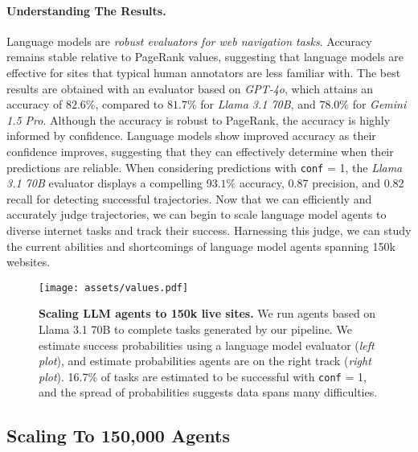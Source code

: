 \paragraph{Understanding The Results.} Language models are \textit{robust evaluators for web navigation tasks}. Accuracy remains stable relative to PageRank values, suggesting that language models are effective for sites that typical human annotators are less familiar with. The best results are obtained with an evaluator based on \textit{GPT-4o}, which attains an accuracy of $82.6\%$, compared to $81.7\%$ for \textit{Llama 3.1 70B}, and $78.0\%$ for \textit{Gemini 1.5 Pro}. Although the accuracy is robust to PageRank, the accuracy is highly informed by confidence. Language models show improved accuracy as their confidence improves, suggesting that they can effectively determine when their predictions are reliable. When considering predictions with \texttt{conf} = 1, the \textit{Llama 3.1 70B} evaluator displays a compelling $93.1\%$ accuracy, 0.87 precision, and 0.82 recall for detecting successful trajectories. Now that we can efficiently and accurately judge trajectories, we can begin to scale language model agents to diverse internet tasks and track their success. Harnessing this judge, we can study the current abilities and shortcomings of language model agents spanning 150k websites.

\begin{wrapfigure}{r}{0.48\textwidth}
    \centering
    \vspace{-1.5cm}
    \texttt{[image: assets/values.pdf]}
    \vspace{-0.7cm}
    \caption{\small \textbf{Scaling LLM agents to 150k live sites.} We run agents based on Llama 3.1 70B to complete tasks generated by our pipeline. We estimate success probabilities using a language model evaluator (\textit{left plot}), and estimate probabilities agents are on the right track (\textit{right plot}). 16.7\% of tasks are estimated to be successful with \texttt{conf} = 1, and the spread of probabilities suggests data spans many difficulties.}
    \label{fig:data-statistics}
    \vspace{-0.2cm}
\end{wrapfigure}

\subsection{Scaling To 150,000 Agents}
\label{sec:scaling-agents} 

